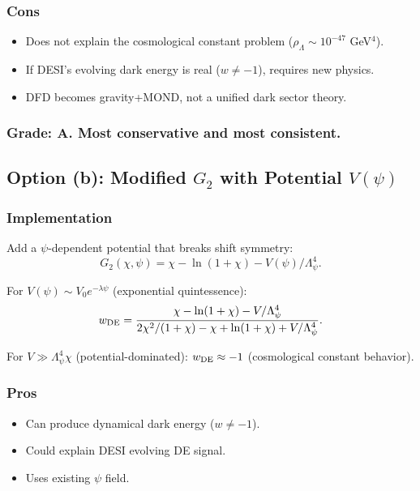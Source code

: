 \documentclass[11pt,a4paper]{article}
\begin{document}
\subsubsection{Cons}
\begin{itemize}
\item Does not explain the cosmological constant problem ($\rho_\Lambda \sim 10^{-47}$ GeV$^4$).
\item If DESI's evolving dark energy is real ($w \neq -1$), requires new physics.
\item DFD becomes gravity+MOND, not a unified dark sector theory.
\end{itemize}

\subsubsection{Grade: A. Most conservative and most consistent.}

\subsection{Option (b): Modified $G_2$ with Potential $V(\psi)$}

\subsubsection{Implementation}

Add a $\psi$-dependent potential that breaks shift symmetry:
\begin{equation}
G_2(\chi, \psi) = \chi - \ln(1+\chi) - V(\psi)/\Lambda_\psi^4.
\end{equation}

For $V(\psi) \sim V_0 e^{-\lambda\psi}$ (exponential quintessence):
\begin{equation}
w_{\rm DE} = \frac{\chi - \ln(1+\chi) - V/\Lambda_\psi^4}{2\chi^2/(1+\chi) - \chi + \ln(1+\chi) + V/\Lambda_\psi^4}.
\end{equation}

For $V \gg \Lambda_\psi^4 \chi$ (potential-dominated): $w_{\rm DE} \approx -1$ (cosmological constant behavior).

\subsubsection{Pros}
\begin{itemize}
\item Can produce dynamical dark energy ($w \neq -1$).
\item Could explain DESI evolving DE signal.
\item Uses existing $\psi$ field.
\end{itemize}
\end{document}
